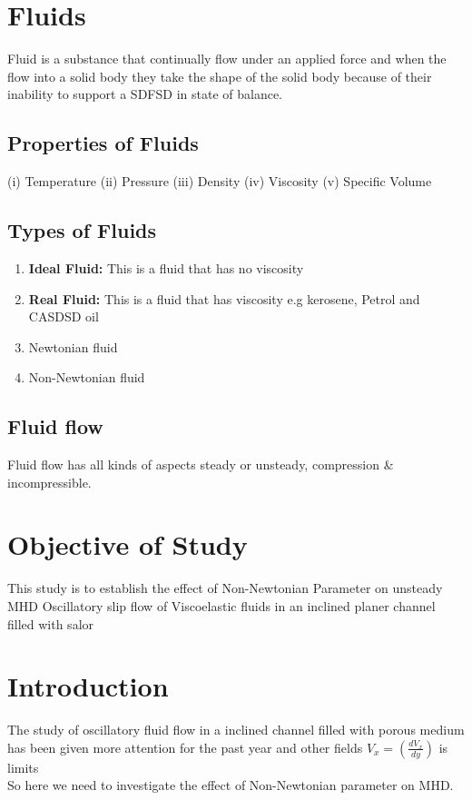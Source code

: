 \documentclass[12pt]{report}
\newcommand{\bt}[1]{\textbf{#1}}
\newcommand{\sps}{\\[0.2cm]}
\newcommand{\dsp}{\displaystyle}
\begin{document}
	\section{Fluids}
	Fluid is a substance that continually flow under an applied force and when the flow into a solid body they take the shape of the solid body because of their inability to support a SDFSD in state of balance.
	
	\subsection{Properties of Fluids}
	(i) Temperature (ii) Pressure (iii) Density (iv) Viscosity (v) Specific Volume

	\subsection{Types of Fluids}
	\begin{enumerate}
		\item \bt{Ideal Fluid:} This is a fluid that has no viscosity
		\item \bt{Real Fluid:} This is a fluid that has viscosity e.g kerosene, Petrol and CASDSD oil
		\item Newtonian fluid
		\item Non-Newtonian fluid
	\end{enumerate}

	\subsection{Fluid flow}
	Fluid flow has all kinds of aspects steady or unsteady, compression \& incompressible.
	
	\section{Objective of Study}
	This study is to establish the effect of Non-Newtonian Parameter on unsteady MHD Oscillatory slip flow of Viscoelastic fluids in an inclined planer channel filled with salor
	
	\section{Introduction}
	The study of oscillatory fluid flow in a inclined channel filled with porous medium has been given more attention for the past year and other fields $\dsp V_x = (\frac{dV_x}{dy})$ is limits\sps
	So here we need to investigate the effect of Non-Newtonian parameter on MHD.
\end{document}
